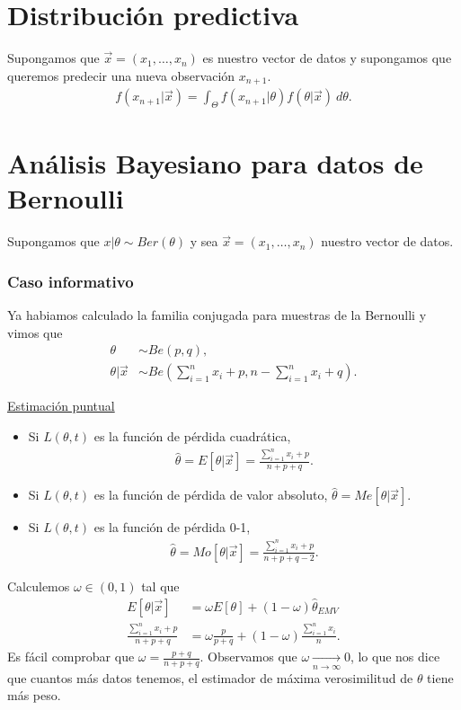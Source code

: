 \section{Distribución predictiva}
Supongamos que $\vec{x} = (x_1, \ldots, x_n)$ es nuestro vector de datos y supongamos que queremos predecir una nueva observación $x_{n+1}$.
\begin{align*}
    f(x_{n+1} | \vec{x}) = \int_{\Theta} f(x_{n+1} | \theta) f(\theta | \vec{x}) \ d\theta.
\end{align*}
\begin{ejemplo}

\end{ejemplo}

\section{Análisis Bayesiano para datos de Bernoulli}
Supongamos que $x | \theta \sim Ber(\theta)$ y sea $\vec{x} = (x_1, \ldots, x_n)$ nuestro vector de datos.

\subsubsection{Caso informativo}
Ya habiamos calculado la familia conjugada para muestras de la Bernoulli y vimos que
\begin{align*}
    \theta           & \sim Be(p,q),                                                             \\
    \theta | \vec{x} & \sim Be\left( \sum_{i=1}^{n} x_i + p, n - \sum_{i=1}^{n} x_i + q \right).
\end{align*}

\underline{Estimación puntual}
\begin{itemize}
    \item Si $L(\theta,t)$ es la función de pérdida cuadrática,
          \begin{align*}
              \widehat{\theta} = E[\theta |  \vec{x}] = \frac{\sum_{i=1}^{n} x_i + p}{n + p + q}.
          \end{align*}
    \item Si $L(\theta,t)$ es la función de pérdida de valor absoluto, $\widehat{\theta} = Me[\theta | \vec{x}]$.
    \item Si $L(\theta,t)$ es la función de pérdida 0-1,
          \begin{align*}
              \widehat{\theta} = Mo[\theta | \vec{x}] = \frac{\sum_{i=1}^{n} x_i + p}{n + p + q - 2}.
          \end{align*}
\end{itemize}
Calculemos $\omega \in (0,1)$ tal que
\begin{align*}
    E[\theta | \vec{x}]                      & = \omega E[\theta] + (1 - \omega) \widehat{\theta}_{EMV}          \\
    \frac{\sum_{i=1}^{n} x_i + p}{n + p + q} & = \omega \frac{p}{p+q} + (1-\omega) \frac{\sum_{i=1}^{n} x_i}{n}.
\end{align*}
Es fácil comprobar que $\omega = \frac{p+q}{n+p+q}$. Observamos que $\omega \xrightarrow[n \to \infty]{} 0$, lo que nos dice que cuantos más datos tenemos, el estimador de máxima verosimilitud de $\theta$ tiene más peso.

